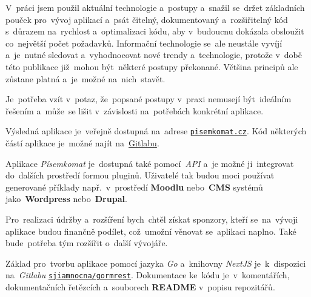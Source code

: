\documentclass[11pt,a4paper]{report}
\begin{document}
        V~práci jsem použil aktuální technologie a~postupy a~snažil se~držet základních pouček pro~vývoj aplikací a~psát čitelný, dokumentovaný a~rozšiřitelný kód s~důrazem na~rychlost a~optimalizaci kódu, aby v~budoucnu dokázala obsloužit co~největší počet požadavků. Informační technologie se~ale neustále vyvíjí a~je~nutné sledovat a~vyhodnocovat nové trendy a~technologie, protože v~době této publikace již~mohou být~některé postupy překonané. Většina principů ale zůstane platná a~je~možné na~nich~stavět.
        
        Je~potřeba vzít v~potaz, že~popsané postupy v~praxi nemusejí být~ideálním řešením a~může~se lišit v~závislosti na~potřebách konkrétní aplikace.
        
        Výsledná aplikace je~veřejně dostupná na~adrese \href{https://pisemkomat.cz}{\texttt{pisemkomat.cz}}. Kód některých částí aplikace je~možné najít na~\href{https://gitlab.com/pisemkomat}{Gitlabu}.
        
        Aplikace \emph{Písemkomat} je~dostupná také pomocí~\emph{API} a~je možné ji~integrovat do~dalších prostředí formou pluginů. Uživatelé tak budou moci používat generované příklady např.~v~prostředí \textbf{Moodlu} nebo~\textbf{CMS} systémů jako~\textbf{Wordpress} nebo~\textbf{Drupal}.
        
        Pro~realizaci údržby a~rozšíření bych~chtěl získat sponzory, kteří se~na~vývoji aplikace budou finančně podílet, což~umožní věnovat se~aplikaci naplno. Také bude~potřeba tým rozšířit o~další vývojáře.
            
        Základ pro~tvorbu aplikace pomocí jazyka \emph{Go} a~knihovny \emph{NextJS} je~k~dispozici na~\emph{Gitlabu} \href{https://gitlab.com/sjiamnocna/gormrest}{\texttt{sjiamnocna/gormrest}}. Dokumentace ke~kódu je~v~komentářích, dokumentačních řetězcích a~souborech \textbf{README} v~popisu repozitářů.

    \newpage
    \printbibliography
\end{document}
